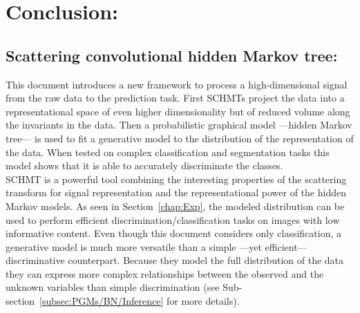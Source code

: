 \documentclass[a4paper,11pt]{report}
\begin{document}
		
\chapter{Conclusion:}
	\label{chap:ccl}

  \section{Scattering convolutional hidden Markov tree:}
		This document introduces a new framework to process a high-dimensional signal from the raw data to the prediction task. First SCHMTs project the data into a representational space of even higher dimensionality but of reduced volume along the invariants in the data. Then a probabilistic graphical model ---hidden Markov tree--- is used to fit a generative model to the distribution of the representation of the data. When tested on complex classification and segmentation tasks this model shows that it is able to accurately discriminate the classes.\\
  
		SCHMT is a powerful tool combining the interesting properties of the scattering transform for signal representation and the representational power of the hidden Markov models. As seen in Section~\ref{chap:Exp}, the modeled distribution can be used to perform efficient discrimination/classification tasks on images with low informative content. Even though this document considers only classification, a generative model is much more versatile than a simple ---yet efficient--- discriminative counterpart. Because they model the full distribution of the data they can express more complex relationships between the observed and the unknown variables than simple discrimination (see Sub-section~\ref{subsec:PGMs/BN/Inference} for more details).
  
    
\end{document}
